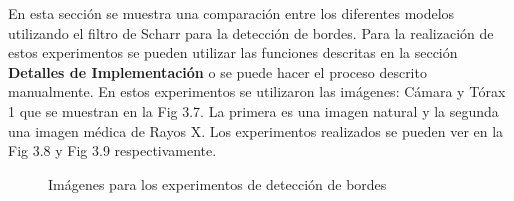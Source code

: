 En esta secci\'on se muestra una comparaci\'on entre los diferentes modelos utilizando el filtro de Scharr para la detecci\'on de bordes. Para la realizaci\'on de estos experimentos se pueden utilizar las funciones descritas en la secci\'on \textbf{Detalles de Implementaci\'on} o se puede hacer el proceso descrito manualmente. En estos experimentos se utilizaron las im\'agenes: C\'amara y T\'orax 1 que se muestran en la Fig 3.7. La primera es una imagen natural y la segunda una imagen m\'edica de Rayos X. Los experimentos realizados se pueden ver en la Fig 3.8 y Fig 3.9 respectivamente.

\begin{figure}
	\begin{center}
		\caption{Im\'agenes para los experimentos de detecci\'on de bordes}
	\end{center}
\end{figure}

